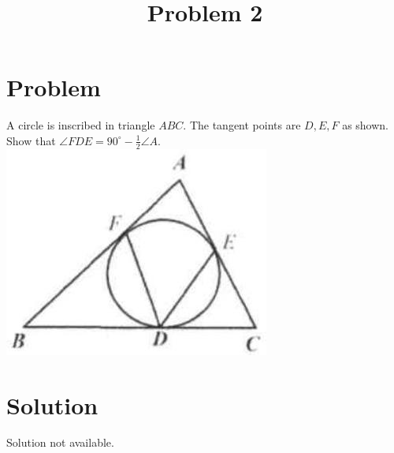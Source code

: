 \documentclass{article}
\title{Problem 2}
\date{}
\begin{document}
\maketitle

\section*{Problem}
A circle is inscribed in triangle \(A B C\). The tangent points are \(D, E, F\) as shown. Show that \(\angle F D E=90^{\circ}-\frac{1}{2} \angle A\).\\
\centering
\includegraphics[width=\textwidth]{images/206(3).jpg}

\section*{Solution}
Solution not available.
\end{document}
